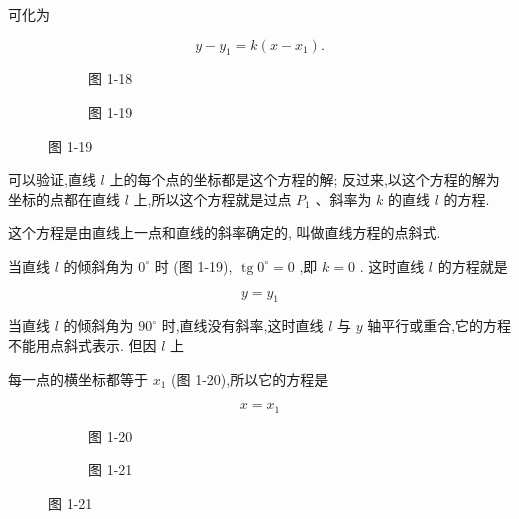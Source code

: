 \documentclass[lang=cn,newtx,10.5pt,scheme=chinese]{elegantbook}
\begin{document}
可化为

\begin{corollary}[点斜式]
\[
  y - {y}_{1} = k\left( {x - {x}_{1}}\right) .
\]
\end{corollary}

\begin{figure}[h]
	\centering
	\begin{subfigure}[h]{0.45\textwidth}
		\centering
		
		\caption{图 1-18}
	\end{subfigure}
	\hfill %
	\begin{subfigure}[h]{0.45\textwidth}
		\centering
		
		\caption{图 1-19}
	\end{subfigure}
\end{figure}

可以验证,直线 \(l\) 上的每个点的坐标都是这个方程的解; 反过来,以这个方程的解为坐标的点都在直线 \(l\) 上,所以这个方程就是过点 \({P}_{1}\) 、斜率为 \(k\) 的直线 \(l\) 的方程.

这个方程是由直线上一点和直线的斜率确定的, 叫做直线方程的点斜式.

当直线 \(l\) 的倾斜角为 \({0}^{ \circ }\) 时 (图 1-19), \(\operatorname{tg}{0}^{ \circ } = 0\) ,即 \(k = 0\) . 这时直线 \(l\) 的方程就是

\[
  y = {y}_{1}
\]

当直线 \(l\) 的倾斜角为 \({90}^{ \circ }\) 时,直线没有斜率,这时直线 \(l\) 与 \(y\) 轴平行或重合,它的方程不能用点斜式表示. 但因 \(l\) 上

每一点的横坐标都等于 \({x}_{1}\) (图 1-20),所以它的方程是

\[
  x = {x}_{1}
\]

\begin{figure}[h]
	\centering
	\begin{subfigure}[h]{0.45\textwidth}
		\centering
		
		\caption{图 1-20}
	\end{subfigure}
	\hfill %
	\begin{subfigure}[h]{0.45\textwidth}
		\centering
		
		\caption{图 1-21}
	\end{subfigure}
\end{figure}
\end{document}
